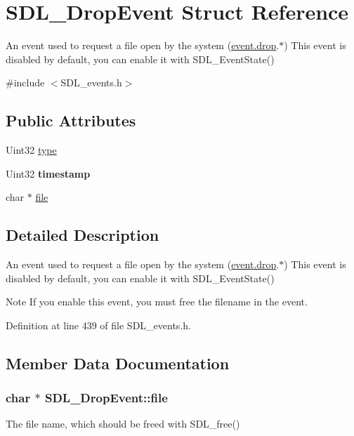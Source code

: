 \hypertarget{structSDL__DropEvent}{\section{S\+D\+L\+\_\+\+Drop\+Event Struct Reference}
\label{structSDL__DropEvent}
}


An event used to request a file open by the system (\hyperlink{unionSDL__Event_acff77bccbca65abbb876360a3f5209c9}{event.\+drop}.$\ast$) This event is disabled by default, you can enable it with S\+D\+L\+\_\+\+Event\+State()  




{\ttfamily \#include $<$S\+D\+L\+\_\+events.\+h$>$}

\subsection*{Public Attributes}
\begin{DoxyCompactItemize}
\item 
Uint32 \hyperlink{structSDL__DropEvent_a5ea27cfaa5f8d4940e9a69b68b3cc035}{type}
\item 
\hypertarget{structSDL__DropEvent_a02d2c81bb22db632a40cd0021ff751ab}{Uint32 {\bfseries timestamp}}\label{structSDL__DropEvent_a02d2c81bb22db632a40cd0021ff751ab}

\item 
char $\ast$ \hyperlink{structSDL__DropEvent_adf3eb48d332665a6546e262f33d8e15f}{file}
\end{DoxyCompactItemize}


\subsection{Detailed Description}
An event used to request a file open by the system (\hyperlink{unionSDL__Event_acff77bccbca65abbb876360a3f5209c9}{event.\+drop}.$\ast$) This event is disabled by default, you can enable it with S\+D\+L\+\_\+\+Event\+State() 

\begin{DoxyNote}{Note}
If you enable this event, you must free the filename in the event. 
\end{DoxyNote}


Definition at line 439 of file S\+D\+L\+\_\+events.\+h.



\subsection{Member Data Documentation}
\hypertarget{structSDL__DropEvent_adf3eb48d332665a6546e262f33d8e15f}{
\subsubsection[{file}]{\setlength{\rightskip}{0pt plus 5cm}char $\ast$ S\+D\+L\+\_\+\+Drop\+Event\+::file}}\label{structSDL__DropEvent_adf3eb48d332665a6546e262f33d8e15f}
The file name, which should be freed with S\+D\+L\+\_\+free() 

